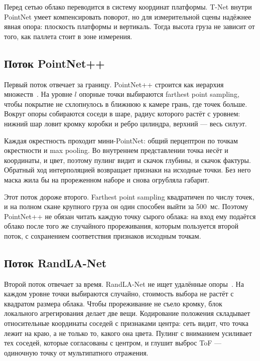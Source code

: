 \documentclass{misisarticle}
\begin{document}
Перед сетью облако переводится в систему координат платформы. T-Net внутри PointNet умеет компенсировать поворот, но для измерительной сцены надёжнее явная опора: плоскость платформы и вертикаль. Тогда высота груза не зависит от того, как паллета стоит в зоне измерения.

\subsection{Поток PointNet++}

Первый поток отвечает за границу. PointNet++ строится как иерархия множеств~\cite{pointnetpp}. На уровне $l$ опорные точки выбираются farthest point sampling, чтобы покрытие не схлопнулось в ближнюю к камере грань, где точек больше. Вокруг опоры собираются соседи в шаре, радиус которого растёт с уровнем: нижний шар ловит кромку коробки и ребро цилиндра, верхний --- весь силуэт.

Каждая окрестность проходит мини-PointNet: общий перцептрон по точкам окрестности и max pooling. Во внутреннем представлении точка несёт и координаты, и цвет, поэтому пулинг видит и скачок глубины, и скачок фактуры. Обратный ход интерполяцией возвращает признаки на исходные точки. Без него маска жила бы на прореженном наборе и снова огрубляла габарит.

Этот поток дороже второго. Farthest point sampling квадратичен по числу точек, и на полном скане крупного груза он один способен выйти за 500~мс. Поэтому PointNet++ не обязан читать каждую точку сырого облака: на вход ему подаётся облако после того же случайного прореживания, которым пользуется второй поток, с сохранением соответствия признаков исходным точкам.

\subsection{Поток RandLA-Net}

Второй поток отвечает за время. RandLA-Net не ищет удалённые опоры~\cite{randlanet}. На каждом уровне точки выбираются случайно, стоимость выбора не растёт с квадратом размера облака. Чтобы прореживание не съело кромку, блок локального агрегирования делает две вещи. Кодирование положения складывает относительные координаты соседей с признаками центра: сеть видит, что точка лежит на краю, а не только то, какого она цвета. Пулинг с вниманием усиливает тех соседей, которые согласованы с центром, и глушит выброс ToF --- одиночную точку от мультипатного отражения.
\end{document}
